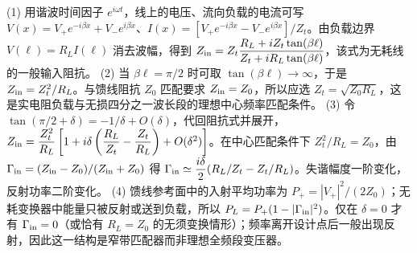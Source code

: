 (1) 用谐波时间因子 \(e^{i\omega t}\)，线上的电压、流向负载的电流可写 \(V(x)=V_+e^{-i\beta x}+V_-e^{i\beta x}\)、\(I(x)=[V_+e^{-i\beta x}-V_-e^{i\beta x}]/Z_t\)。由负载边界 \(V(\ell)=R_LI(\ell)\) 消去波幅，得到 \(Z_{\rm in}=Z_t\dfrac{R_L+iZ_t\tan(\beta\ell)}{Z_t+iR_L\tan(\beta\ell)}\)，该式为无耗线的一般输入阻抗。
(2) 当 \(\beta\ell=\pi/2\) 时可取 \(\tan(\beta\ell)\to\infty\)，于是 \(Z_{\rm in}=Z_t^2/R_L\)。与馈线阻抗 \(Z_0\) 匹配要求 \(Z_{\rm in}=Z_0\)，所以应选 \(Z_t=\sqrt{Z_0R_L}\)，这是实电阻负载与无损四分之一波长段的理想中心频率匹配条件。
(3) 令 \(\tan(\pi/2+\delta)=-1/\delta+O(\delta)\)，代回阻抗式并展开，\(Z_{\rm in}=\dfrac{Z_t^2}{R_L}\left[1+i\delta\left(\dfrac{R_L}{Z_t}-\dfrac{Z_t}{R_L}\right)+O(\delta^2)\right]\)。在中心匹配条件下 \(Z_t^2/R_L=Z_0\)，由 \(\Gamma_{\rm in}=(Z_{\rm in}-Z_0)/(Z_{\rm in}+Z_0)\) 得 \(\Gamma_{\rm in}\simeq\dfrac{i\delta}{2}(R_L/Z_t-Z_t/R_L)\)。失谐幅度一阶变化，反射功率二阶变化。
(4) 馈线参考面中的入射平均功率为 \(P_+=|V_+|^2/(2Z_0)\)；无耗变换器中能量只被反射或送到负载，所以 \(P_L=P_+(1-|\Gamma_{\rm in}|^2)\)。仅在 \(\delta=0\) 才有 \(\Gamma_{\rm in}=0\)（或恰有 \(R_L=Z_0\) 的无须变换情形）；频率离开设计点后一般出现反射，因此这一结构是窄带匹配器而非理想全频段变压器。
